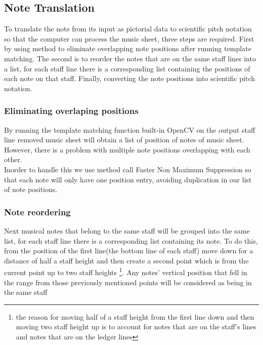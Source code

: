 \documentclass[a4paper,12pt]{report}
\begin{document}
\clearpage

\subsection{Note Translation}

To translate the note from its input as pictorial data to scientific pitch
notation so that the computer can process the music sheet, three steps are
required. First by using \textcite{Rosebrock} method to eliminate overlapping
note positions after running template matching. The second is to reorder the
notes that are on the same staff lines into a list, for each staff line there is
a corresponding list containing the positions of each note on that staff.
Finally, converting the note positions into scientific pitch notation.

\subsubsection{Eliminating overlaping positions}
By running the template matching function built-in OpenCV on the output staff
line removed music sheet will obtain a list of position of notes of music sheet.
However, there is a problem with multiple note positions overlapping with each
other.\\

Inorder to handle this we use  \textcite{Rosebrock} method call Faster Non
Maximum Suppression so that each note will only have one position entry, avoiding
duplication in our list of note positions.\\

\subsubsection{Note reordering} 

Next musical notes that belong to the same staff
will be grouped into the same list,  for each staff line there is a
corresponding list containing its note.  To do this, from the position of the
first line(the bottom line of each staff) move down for a distance of half a
staff height and then create a second point which is from the current point up
to two staff heights \footnote{the reason for moving half of a staff height from
the first line down and then moving two staff height up  is to account for notes
that are on the staff's lines and notes that are on the ledger lines}. Any notes'
vertical position that fell in the range from those previously mentioned points
will be considered as being in the same staff \\
\end{document}
